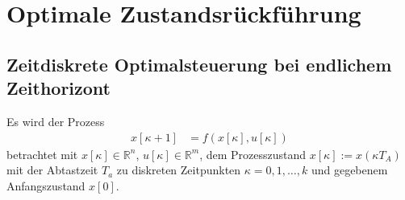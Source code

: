 \chapter{Optimale Zustandsrückführung}
\section{Zeitdiskrete Optimalsteuerung bei endlichem Zeithorizont}
Es wird der Prozess
\begin{align}
	x[\kappa + 1] & = f\left(x[\kappa], u[\kappa] \right)
\end{align}
betrachtet mit $x[\kappa]\in\mathbb{R}^n$, $u[\kappa]\in\mathbb{R}^m$, dem Prozesszustand $x[\kappa]:=x(\kappa T_A)$ mit der Abtastzeit $T_a$ zu
diskreten Zeitpunkten $\kappa=0,1,\ldots,k$ und gegebenem Anfangszustand $x[0]$.


